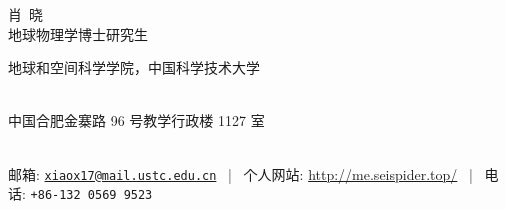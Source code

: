 \documentclass[11pt, a4paper]{article}
\makeatletter
\newcommand{\FirstName}{肖}
\newcommand{\LastName}{晓}
\newcommand{\MyName}{\FirstName\ \LastName}
\newcommand{\MyRole}{地球物理学博士研究生}
\newcommand{\Email}{xiaox17@mail.ustc.edu.cn}
\newcommand{\Website}{http://me.seispider.top/}
\newcommand{\Phone}{+86-132\,0569\,9523}
\newcommand{\Affiliation}{
    地球和空间科学学院，中国科学技术大学
}
\newcommand{\Address}{
    中国合肥金寨路 96 号教学行政楼 1127 室
}
\newcommand{\makefield}[2]{\makebox[1.5em]{\color{MarkerColour!80!black}#1} #2}
\makeatother
\begin{document}
\thispagestyle{empty}

\begin{center}
    {\fontsize{36pt}{0}\selectfont \MyName}
    \\[0.5cm]
    {\fontsize{16pt}{0}\selectfont \MyRole}
    \\[0.3cm]
    {\fontsize{10pt}{0}\selectfont
        \Affiliation
        \\[0.2cm]
        \Address
        \\[0.08cm]
        邮箱: \href{mailto:\Email}{\texttt{\Email}}
        \, | \,
        个人网站: \url{\Website}
        \, | \,
        电话: \texttt{\Phone}
    }
\end{center}








%

%
\end{document}
